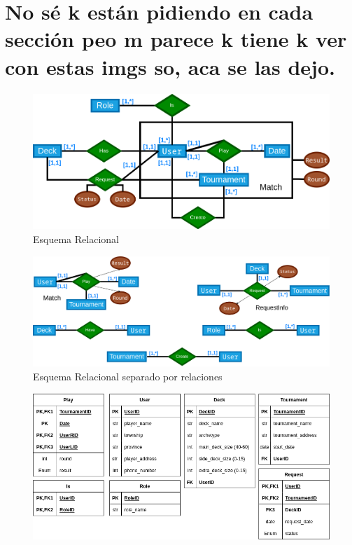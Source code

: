 \documentclass[a4paper]{article}
\begin{document}
\section{No s\'e k est\'an pidiendo en cada secci\'on peo m parece k tiene k ver con estas imgs so, aca se las dejo.}

\begin{figure}[h]
  \centering
  \includegraphics[width=1\textwidth]{merx.png}
  \caption{Esquema Relacional}
  \label{fig:etiqueta}
\end{figure}
\begin{figure}[h]
  \centering
  \includegraphics[width=1\textwidth]{relations.png}
  \caption{Esquema Relacional separado por relaciones}
  \label{fig:etiqueta}
\end{figure}

\begin{figure}[h]
  \centering
  \includegraphics[width=1\textwidth]{table.png}
  \label{fig:etiqueta}
\end{figure}
\end{document}
